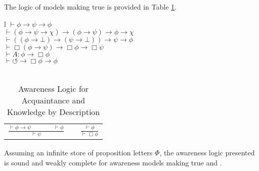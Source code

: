 
The logic of models making true  %
is provided in Table \ref{logic0}.

\begin{table}[h]
  \begin{tabular}{l}
    $\vdash \phi \rightarrow \psi \rightarrow \phi$\\
    $\vdash (\phi \rightarrow \psi \rightarrow \chi) \rightarrow (\phi
    \rightarrow \psi) \rightarrow \phi \rightarrow \chi$\\
    $\vdash ((\phi \rightarrow \bot) \rightarrow (\psi \rightarrow \bot))
    \rightarrow \psi \rightarrow \phi$\\
    $\vdash \Box(\phi \rightarrow \psi) \rightarrow \Box \phi \rightarrow \Box
    \psi$\\
    $\vdash A : \phi \rightarrow \Box \phi$\\
    $\vdash \circlearrowleft \rightarrow \Box \phi \rightarrow \phi$\\
    \\
    \begin{tabular}{lll}
      $\frac{\vdash \phi \rightarrow \psi \hspace{4em} \vdash \phi}{\vdash
      \psi}$ & {\hspace{6em}} & $\frac{\vdash \phi}{\vdash \Box \phi}$
    \end{tabular}
  \end{tabular}
  \caption{\label{logic0}Awareness Logic for Acquaintance and
    Knowledge by Description}
\end{table}

\begin{theorem}
  \label{completeness0}Assuming an infinite store of proposition letters
  $\Phi$, the awareness logic presented is sound and weakly complete for
  awareness models making true  and .
\end{theorem}




